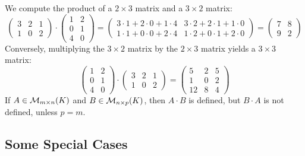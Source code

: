 \begin{example}
We compute the product of a $2 \times 3$ matrix and a $3 \times 2$ matrix:
\begin{equation*}
    \begin{pmatrix} 3 & 2 & 1 \\ 1 & 0 & 2 \end{pmatrix} \cdot \begin{pmatrix} 1 & 2 \\ 0 & 1 \\ 4 & 0 \end{pmatrix} = \begin{pmatrix} 3 \cdot 1 + 2 \cdot 0 + 1 \cdot 4 & 3 \cdot 2 + 2 \cdot 1 + 1 \cdot 0 \\ 1 \cdot 1 + 0 \cdot 0 + 2 \cdot 4 & 1 \cdot 2 + 0 \cdot 1 + 2 \cdot 0 \end{pmatrix} = \begin{pmatrix} 7 & 8 \\ 9 & 2 \end{pmatrix}
\end{equation*}
Conversely, multiplying the $3 \times 2$ matrix by the $2 \times 3$ matrix yields a $3 \times 3$ matrix:
\begin{equation*}
    \begin{pmatrix} 1 & 2 \\ 0 & 1 \\ 4 & 0 \end{pmatrix} \cdot \begin{pmatrix} 3 & 2 & 1 \\ 1 & 0 & 2 \end{pmatrix} = \begin{pmatrix} 5 & 2 & 5 \\ 1 & 0 & 2 \\ 12 & 8 & 4 \end{pmatrix}
\end{equation*}
If $A \in \mathcal{M}_{m \times n}(K)$ and $B \in \mathcal{M}_{n \times p}(K)$, then $A \cdot B$ is defined, but $B \cdot A$ is not defined, unless $p = m$.
\end{example}

\subsection{Some Special Cases}

